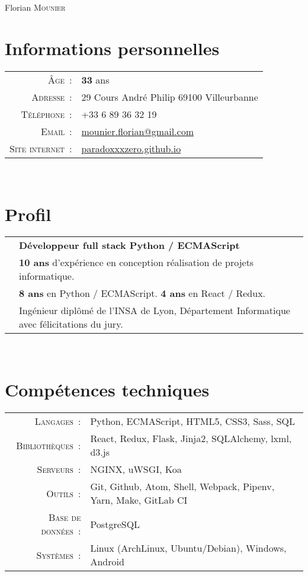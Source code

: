 \documentclass[a4paper,10pt]{article}
\begin{document}
  \pagestyle{empty}
  \par{\centering
    {\Huge Florian \textsc{Mounier}
    }\bigskip\par}

  \section{Informations personnelles}
  \begin{tabular}{rl}
    \textsc{Âge :}
      & \textbf{33} ans \\
    \textsc{Adresse :}
      & 29 Cours André Philip 69100 Villeurbanne \\
    \textsc{Téléphone :}
      & +33 6 89 36 32 19 \\
    \textsc{Email :}
      & \href{mailto:mounier.florian@gmail.com}{mounier.florian@gmail.com} \\
    \textsc{Site internet :}
      & \href{http://paradoxxxzero.github.com}{paradoxxxzero.github.io} \\
  \end{tabular} \\

  \section{Profil}
  \begin{tabular}{rl}
    & \textbf {Développeur full stack Python / ECMAScript} \\
    & \textbf{10 ans} d’expérience en conception réalisation de projets informatique. \\
    & \textbf{8 ans} en Python / ECMAScript. \textbf{4 ans} en React / Redux. \\
    & Ingénieur diplômé de l’INSA de Lyon,
    Département Informatique avec félicitations du jury. \\
  \end{tabular} \\

  \section{Compétences techniques}
  \begin{tabular}{rl}
    \textsc{Langages :}
      & Python, ECMAScript, HTML5, CSS3, Sass, SQL \\
    \textsc{Bibliothèques :}
      & React, Redux, Flask, Jinja2, SQLAlchemy, lxml, d3.js \\
    \textsc{Serveurs :}
      & NGINX, uWSGI, Koa \\
    \textsc{Outils :}
      & Git, Github, Atom, Shell, Webpack, Pipenv, Yarn, Make, GitLab CI \\
    \textsc{Base de données :}
      & PostgreSQL \\
    \textsc{Systèmes :}
      & Linux (ArchLinux, Ubuntu/Debian), Windows, Android \\
  \end{tabular} \\
\end{document}

